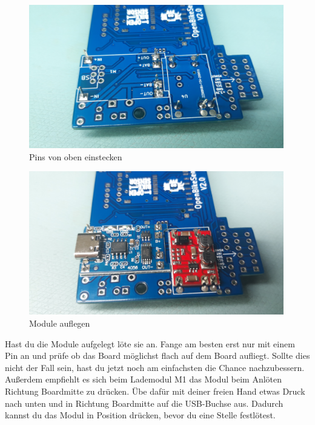 \documentclass[12pt, a4paper]{article}		%
\begin{document}
\begin{minipage}[t]{0.49\textwidth}
\begin{figure}[H]
	\centering
		\includegraphics[width=0.99\textwidth]{Grafiken/20200726_123048.jpg}
	\caption{Pins von oben einstecken}
	\label{fig:20200726_123048}
\end{figure}
\end{minipage}
\begin{minipage}[t]{0.49\textwidth}
\begin{figure}[H]
	\centering
		\includegraphics[width=0.99\textwidth]{Grafiken/20200726_123110.jpg}
	\caption{Module auflegen}
	\label{fig:20200726_123110}
\end{figure}
\end{minipage}
\newline

Hast du die Module aufgelegt löte sie an. Fange am besten erst nur mit einem Pin an und prüfe ob das Board möglichst flach auf dem Board aufliegt. Sollte dies nicht der Fall sein, hast du jetzt noch am einfachsten die Chance nachzubessern. Außerdem empfiehlt es sich beim Lademodul M1 das Modul beim Anlöten Richtung Boardmitte zu drücken. Übe dafür mit deiner freien Hand etwas Druck nach unten und in Richtung Boardmitte auf die USB-Buchse aus. Dadurch kannst du das Modul in Position drücken, bevor du eine Stelle festlötest.\\ \newline
\end{document}
